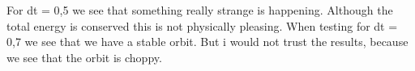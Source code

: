 \documentclass[norsk,a4paper,12pt]{article}
\begin{document}
\begin{figure}[H]
  \begin{center}
  \end{center}
 \caption{\textit{ }}
  \label{fig:edge}
\end{figure}

For dt = 0,5 we see that something really strange is happening. Although the total energy is conserved this is not physically 
pleasing. When testing for dt = 0,7 we see that we have a stable orbit. But i would not trust the results, because we see that the orbit
is choppy.
\end{document}
